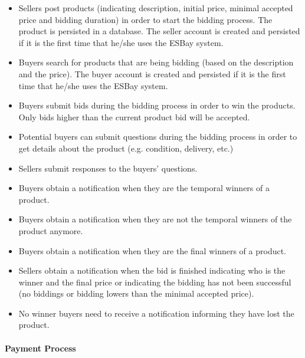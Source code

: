 \documentclass[12pt]{article}
\begin{document}
\begin{itemize}
  \item Sellers post products (indicating description, initial price, minimal accepted price and bidding duration) in
        order to start the bidding process. The product is persisted in a database. The seller account is created and
        persisted if it is the first time that he/she uses the ESBay system.
  \item Buyers search for products that are being bidding (based on the description and the price). The buyer
        account is created and persisted if it is the first time that he/she uses the ESBay system.
  \item Buyers submit bids during the bidding process in order to win the products. Only bids higher than the
        current product bid will be accepted.
  \item Potential buyers can submit questions during the bidding process in order to get details about the product
        (e.g. condition, delivery, etc.)
  \item Sellers submit responses to the buyers' questions.
  \item Buyers obtain a notification when they are the temporal winners of a product.
  \item Buyers obtain a notification when they are not the temporal winners of the product anymore.
  \item Buyers obtain a notification when they are the final winners of a product.
  \item Sellers obtain a notification when the bid is finished indicating who is the winner and the final price or
        indicating the bidding has not been successful (no biddings or bidding lowers than the minimal accepted
        price).
  \item No winner buyers need to receive a notification informing they have lost the product.
\end{itemize}

\paragraph{Payment Process}
\end{document}
